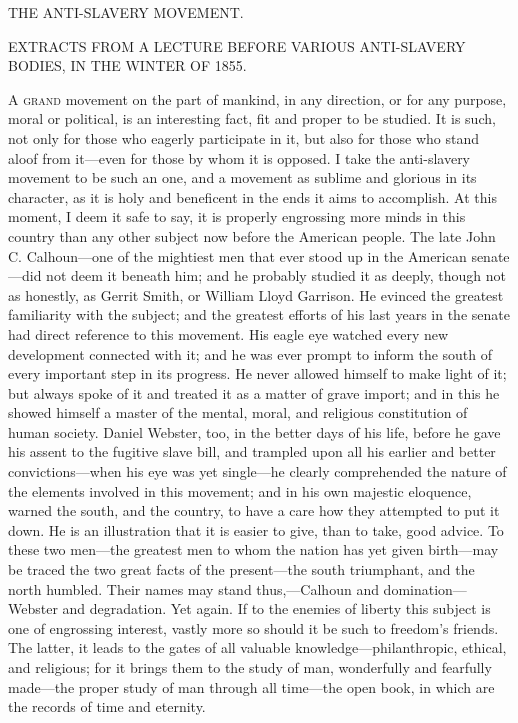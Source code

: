 {\protect\hypertarget{457}{}{}}

{THE ANTI-SLAVERY MOVEMENT.}

{EXTRACTS FROM A LECTURE BEFORE VARIOUS ANTI-SLAVERY BODIES, IN THE
WINTER OF 1855.}

\textsc{A grand} movement on the part of mankind, in any direction, or
for any purpose, moral or political, is an interesting fact, fit and
proper to be studied. It is such, not only for those who eagerly
participate in it, but also for those who stand aloof from it---even for
those by whom it is opposed. I take the anti-slavery movement to be such
an one, and a movement as sublime and glorious in its character, as it
is holy and beneficent in the ends it aims to accomplish. At this
moment, I deem it safe to say, it is properly engrossing more minds in
this country than any other subject now before the American people. The
late John C. Calhoun---one of the mightiest men that ever stood up in
the American senate---did not deem it beneath him; and he probably
studied it as deeply, though not as honestly, as Gerrit Smith, or
William Lloyd Garrison. He evinced the greatest familiarity with the
subject; and the greatest efforts of his last years in the senate had
direct reference to this movement. His eagle eye watched every new
development connected with it; and he was ever prompt to inform the
south of every important step in its progress. He never allowed himself
to make light of it; but always spoke of it and treated it as a matter
of grave import; and in this he showed himself a master of the mental,
moral, and religious constitution of human society. Daniel Webster, too,
in the better days of his life, before he gave his assent to the
fugitive slave bill, and trampled upon all his earlier and better
convictions---when his eye was yet single---he clearly comprehended the
nature of the elements involved in this movement; and in his own
majestic eloquence, warned the south, and the country, to have a care
how they attempted to put it down. He is an illustration that it is
easier to give, than to take, good advice. To these two men---the
greatest men to whom the nation has yet given
{\protect\hypertarget{458}{}{}}birth---may be traced the two great facts
of the present---the south triumphant, and the north humbled. Their
names may stand thus,---Calhoun and domination---Webster and
degradation. Yet again. If to the enemies of liberty this subject is one
of engrossing interest, vastly more so should it be such to freedom's
friends. The latter, it leads to the gates of all valuable
knowledge---philanthropic, ethical, and religious; for it brings them to
the study of man, wonderfully and fearfully made---the proper study of
man through all time---the open book, in which are the records of time
and eternity.


